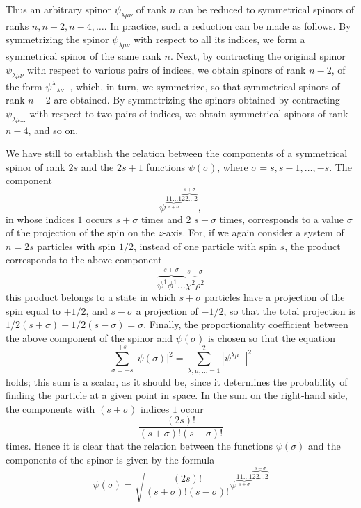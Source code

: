 Thus an arbitrary spinor $ \psi_{\lambda\mu\nu} $ of rank $ n $ can be reduced to symmetrical spinors of ranks $ n, n-2, n-4, \dots $. In practice, such a reduction can be made as follows. By symmetrizing the spinor $ \psi_{\lambda\mu\nu} $ with respect to all its indices, we form a symmetrical spinor of the same rank $ n $. Next, by contracting the original spinor $ \psi_{\lambda\mu\nu} $ with respect to various pairs of indices, we obtain spinors of rank $ n - 2 $, of the form $ \psi^\lambda{}_{\lambda\nu\dots} $, which, in turn, we symmetrize, so that symmetrical spinors of rank $ n-2 $ are obtained. By symmetrizing the spinors obtained by contracting $ \psi_{\lambda\mu\dots} $ with respect to two pairs of indices, we obtain symmetrical spinors of rank $ n-4 $, and so on.

We have still to establish the relation between the components of a symmetrical spinor of rank $ 2s $ and the $ 2s + 1 $ functions $ \psi(\sigma) $, where $ \sigma= s, s - 1, \dots, -s $. The component
\[ \psi^{\underbrace{11\dots1}_{s+\sigma}\overbrace{22\dots2}^{s+\sigma}}, \]
in whose indices $ 1 $ occurs $ s + \sigma $ times and $ 2 $ $ s - \sigma $ times, corresponds to a value $\sigma$ of the projection of the spin on the $ z $-axis. For, if we again consider a system of $ n = 2s $ particles with spin $ 1/2 $, instead of one particle with spin $ s $, the product corresponds to the above component
\[ \overbrace{\psi^1\phi^1\dots}^{s+\sigma}\overbrace{\chi^2\rho^2}^{s-\sigma} \]
this product belongs to a state in which $ s + \sigma $ particles have a projection of the spin equal to $ +1/2 $, and $ s -σ $ a projection of $ -1/2 $, so that the total projection is $ 1/2(s + \sigma) - 1/2(s -\sigma) = \sigma $. Finally, the proportionality coefficient between the above component of the spinor and $ \psi(\sigma) $ is chosen so that the equation
\begin{equation}\label{57.1}
\sum_{\sigma=-s}^{+s}|\psi(\sigma)|^2=\sum_{\lambda,\mu,\dots=1}^{2}|\psi^{\lambda\mu\dots}|^2
\end{equation}
holds; this sum is a scalar, as it should be, since it determines the probability of finding the particle at a given point in space. In the sum on the right-hand side, the components with $ (s + \sigma) $ indices $ 1 $ occur
\[ \frac{(2s)!}{(s+\sigma)!(s-\sigma)!} \]
times. Hence it is clear that the relation between the functions $ \psi(\sigma) $ and the components of the spinor is given by the formula
\begin{equation}\label{57.2}
\psi(\sigma)=\sqrt{\frac{(2s)!}{(s+\sigma)!(s-\sigma)!}}\psi^{\underbrace{11\dots1}_{s+\sigma}\overbrace{22\dots2}^{s-\sigma}}
\end{equation}


